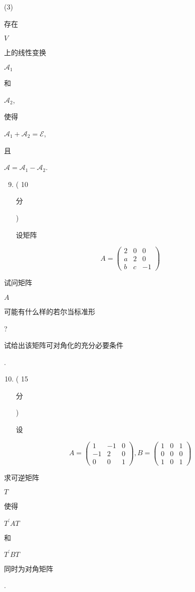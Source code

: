 \documentclass[10pt]{article}
\begin{document}
(3) \begin{CJK}{UTF8}{mj}存在\end{CJK} $V$ \begin{CJK}{UTF8}{mj}上的线性变换\end{CJK} $\mathcal{A}_{1}$ \begin{CJK}{UTF8}{mj}和\end{CJK} $\mathcal{A}_{2}$, \begin{CJK}{UTF8}{mj}使得\end{CJK} $\mathcal{A}_{1}+\mathcal{A}_{2}=\mathcal{E}$, \begin{CJK}{UTF8}{mj}且\end{CJK} $\mathcal{A}=\mathcal{A}_{1}-\mathcal{A}_{2}$.

\begin{enumerate}
  \setcounter{enumi}{8}
  \item ( 10 \begin{CJK}{UTF8}{mj}分\end{CJK}) \begin{CJK}{UTF8}{mj}设矩阵\end{CJK}
\end{enumerate}
$$
A=\left(\begin{array}{ccc}
2 & 0 & 0 \\
a & 2 & 0 \\
b & c & -1
\end{array}\right)
$$
\begin{CJK}{UTF8}{mj}试问矩阵\end{CJK} $A$ \begin{CJK}{UTF8}{mj}可能有什么样的若尔当标准形\end{CJK}? \begin{CJK}{UTF8}{mj}试给出该矩阵可对角化的充分必要条件\end{CJK}.

\begin{enumerate}
  \setcounter{enumi}{9}
  \item ( 15 \begin{CJK}{UTF8}{mj}分\end{CJK}) \begin{CJK}{UTF8}{mj}设\end{CJK}
\end{enumerate}
$$
A=\left(\begin{array}{ccc}
1 & -1 & 0 \\
-1 & 2 & 0 \\
0 & 0 & 1
\end{array}\right), B=\left(\begin{array}{ccc}
1 & 0 & 1 \\
0 & 0 & 0 \\
1 & 0 & 1
\end{array}\right)
$$
\begin{CJK}{UTF8}{mj}求可逆矩阵\end{CJK} $T$ \begin{CJK}{UTF8}{mj}使得\end{CJK} $T^{\prime} A T$ \begin{CJK}{UTF8}{mj}和\end{CJK} $T^{\prime} B T$ \begin{CJK}{UTF8}{mj}同时为对角矩阵\end{CJK}.
\end{document}
